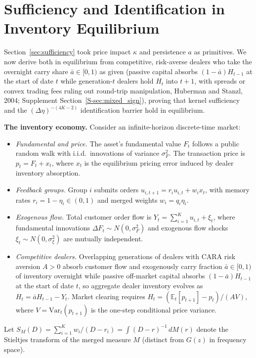 \documentclass[11pt,letterpaper]{article}
\theoremstyle{definition}
\newcommand{\E}{\mathbb{E}}
\newcommand{\Var}{\mathrm{Var}}
\begin{document}
\section{Sufficiency and Identification in Inventory Equilibrium}\label{sec:equilibrium}

Section~\ref{sec:sufficiency} took price impact $\kappa$ and persistence $a$ as primitives. We now derive both in equilibrium from competitive, risk-averse dealers who take the overnight carry share $\bar{a} \in [0, 1)$ as given (passive capital absorbs $(1-\bar{a})H_{t-1}$ at the start of date $t$ while generation-$t$ dealers hold $H_t$ into $t+1$, with spreads or convex trading fees ruling out round-trip manipulation, Huberman and Stanzl, 2004; Supplement Section~\ref{S-sec:mixed_sign}), proving that kernel sufficiency and the $(\Delta\eta)^{-(4K-2)}$ identification barrier hold in equilibrium.

\textbf{The inventory economy.} Consider an infinite-horizon discrete-time market:
\begin{itemize}
  \item \emph{Fundamental and price.} The asset's fundamental value $F_t$ follows a public random walk with i.i.d.\ innovations of variance $\sigma_F^2$. The transaction price is $p_t = F_t + x_t$, where $x_t$ is the equilibrium pricing error induced by dealer inventory absorption.
  \item \emph{Feedback groups.} Group $i$ submits orders $u_{i,t+1} = r_i u_{i,t} + w_i x_t$, with memory rates $r_i = 1 - \eta_i \in (0, 1)$ and merged weights $w_i = q_i \eta_i$.
  \item \emph{Exogenous flow.} Total customer order flow is $Y_t = \sum_{i=1}^K u_{i,t} + \xi_t$, where fundamental innovations $\Delta F_t \sim N(0, \sigma_F^2)$ and exogenous flow shocks $\xi_t \sim N(0, \sigma_\xi^2)$ are mutually independent.
  \item \emph{Competitive dealers.} Overlapping generations of dealers with CARA risk aversion $A > 0$ absorb customer flow and exogenously carry fraction $\bar{a} \in [0, 1)$ of inventory overnight while passive off-market capital absorbs $(1 - \bar{a})H_{t-1}$ at the start of date $t$, so aggregate dealer inventory evolves as $H_t = \bar{a} H_{t-1} - Y_t$. Market clearing requires $H_t = (\E_t[p_{t+1}] - p_t)/(A V)$, where $V = \Var_t(p_{t+1})$ is the one-step conditional price variance.
\end{itemize}
Let $S_M(D) = \sum_{i=1}^K w_i / (D - r_i) = \int (D - r)^{-1} \, dM(r)$ denote the Stieltjes transform of the merged measure $M$ (distinct from $G(z)$ in frequency space).
\end{document}
